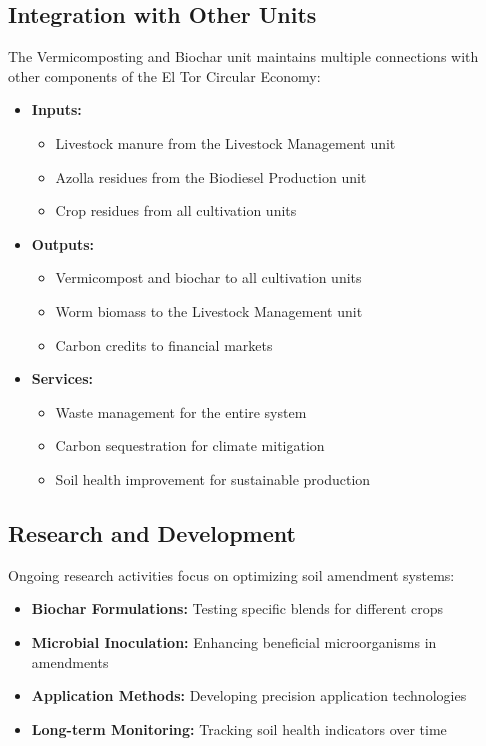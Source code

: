 \subsection{Integration with Other Units}

The Vermicomposting and Biochar unit maintains multiple connections with other components of the El Tor Circular Economy:

\begin{itemize}
    \item \textbf{Inputs:}
    \begin{itemize}
        \item Livestock manure from the Livestock Management unit
        \item Azolla residues from the Biodiesel Production unit
        \item Crop residues from all cultivation units
    \end{itemize}
    
    \item \textbf{Outputs:}
    \begin{itemize}
        \item Vermicompost and biochar to all cultivation units
        \item Worm biomass to the Livestock Management unit
        \item Carbon credits to financial markets
    \end{itemize}
    
    \item \textbf{Services:}
    \begin{itemize}
        \item Waste management for the entire system
        \item Carbon sequestration for climate mitigation
        \item Soil health improvement for sustainable production
    \end{itemize}
\end{itemize}

\subsection{Research and Development}

Ongoing research activities focus on optimizing soil amendment systems:

\begin{itemize}
    \item \textbf{Biochar Formulations:} Testing specific blends for different crops
    \item \textbf{Microbial Inoculation:} Enhancing beneficial microorganisms in amendments
    \item \textbf{Application Methods:} Developing precision application technologies
    \item \textbf{Long-term Monitoring:} Tracking soil health indicators over time
\end{itemize}
